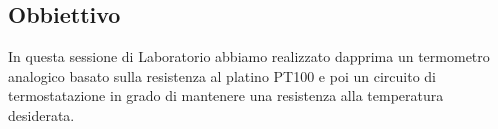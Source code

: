 \subsection{Obbiettivo}

In questa sessione di Laboratorio abbiamo realizzato dapprima un termometro analogico basato sulla resistenza
al platino PT100 e poi un circuito di termostatazione in grado di mantenere una resistenza alla temperatura desiderata.